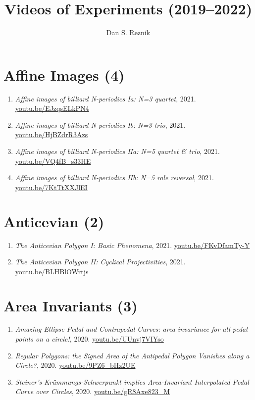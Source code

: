 \documentclass[12pt]{article}
\title{Videos of Experiments (2019--2022)}
\author{Dan S. Reznik}
\begin{document}
\maketitle

\tableofcontents\section{Affine Images (4)}

\begin{enumerate}[resume]
\item \textit{Affine images of billiard N-periodics Ia: N=3 quartet}, 2021. \href{https://youtu.be/EJzqsELkPN4}{\url{youtu.be/EJzqsELkPN4}}
\item \textit{Affine images of billiard N-periodics Ib: N=3 trio}, 2021. \href{https://youtu.be/HjBZdrR3Azs}{\url{youtu.be/HjBZdrR3Azs}}
\item \textit{Affine images of billiard N-periodics IIa: N=5 quartet \& trio}, 2021. \href{https://youtu.be/VQ4fB_s33HE}{\url{youtu.be/VQ4fB\_s33HE}}
\item \textit{Affine images of billiard N-periodics IIb: N=5 role reversal}, 2021. \href{https://youtu.be/7KtTtXXJlEI}{\url{youtu.be/7KtTtXXJlEI}}
\end{enumerate}

\section{Anticevian (2)}

\begin{enumerate}[resume]
\item \textit{The Anticevian Polygon I: Basic Phenomena}, 2021. \href{https://youtu.be/FKvDfamTy-Y}{\url{youtu.be/FKvDfamTy-Y}}
\item \textit{The Anticevian Polygon II: Cyclical Projectivities}, 2021. \href{https://youtu.be/BLHBlOWrtjs}{\url{youtu.be/BLHBlOWrtjs}}
\end{enumerate}

\section{Area Invariants (3)}

\begin{enumerate}[resume]
\item \textit{Amazing Ellipse Pedal and Contrapedal Curves: area invariance for all pedal points on a circle!}, 2020. \href{https://youtu.be/UUnvj7VIYso}{\url{youtu.be/UUnvj7VIYso}}
\item \textit{Regular Polygons: the Signed Area of the Antipedal Polygon Vanishes along a Circle?}, 2020. \href{https://youtu.be/9PZ6_bHz2UE}{\url{youtu.be/9PZ6\_bHz2UE}}
\item \textit{Steiner's Krümmungs-Schwerpunkt implies Area-Invariant Interpolated Pedal Curve over Circles}, 2020. \href{https://youtu.be/gR8Axe823_M}{\url{youtu.be/gR8Axe823\_M}}
\end{enumerate}
\end{document}
